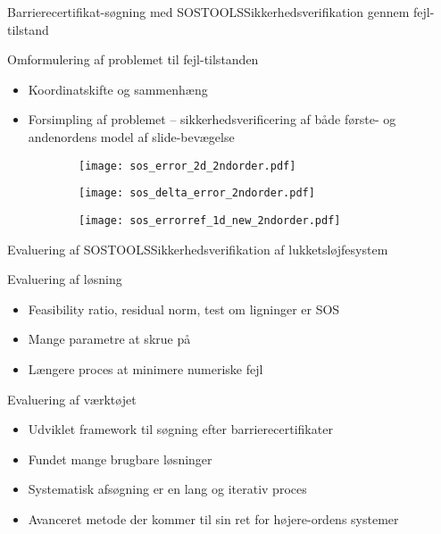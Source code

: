 \begin{frame}{Barrierecertifikat-søgning med SOSTOOLS}{Sikkerhedsverifikation gennem fejl-tilstand}
	\begin{block}{Omformulering af problemet til fejl-tilstanden}
		\begin{itemize}
			\item Koordinatskifte og sammenhæng
			\item Forsimpling af problemet -- sikkerhedsverificering af både første- og andenordens model af slide-bevægelse
		\end{itemize}
	\end{block}
	\begin{figure}[h]
		\begin{subfigure}[h]{.3\textwidth}
			\centering
			\texttt{[image: sos\_error\_2d\_2ndorder.pdf]}
		\end{subfigure}
		\hspace{3mm}
		\begin{subfigure}[h]{.3\textwidth}
			\centering
			\texttt{[image: sos\_delta\_error\_2ndorder.pdf]}
		\end{subfigure}
		\hspace{3mm}
		\begin{subfigure}[h]{.3\textwidth}
			\centering
			\texttt{[image: sos\_errorref\_1d\_new\_2ndorder.pdf]}
		\end{subfigure}
	\end{figure}
\end{frame}

\begin{frame}{Evaluering af SOSTOOLS}{Sikkerhedsverifikation af lukketsløjfesystem}
	\begin{block}{Evaluering af løsning}
		\begin{itemize}
			\item Feasibility ratio, residual norm, test om ligninger er SOS
			\item Mange parametre at skrue på
			\item Længere proces at minimere numeriske fejl
		\end{itemize}
	\end{block}
	\begin{block}{Evaluering af værktøjet}
		\begin{itemize}
			\item Udviklet framework til søgning efter barrierecertifikater
			\item Fundet mange brugbare løsninger
			\item Systematisk afsøgning er en lang og iterativ proces
			\item Avanceret metode der kommer til sin ret for højere-ordens systemer
		\end{itemize}
	\end{block}
\end{frame}